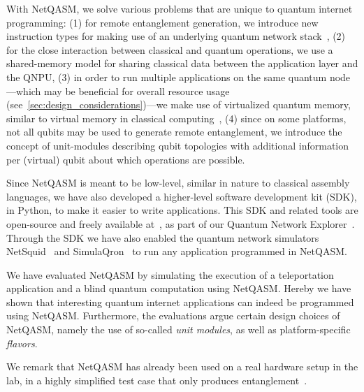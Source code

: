 With \ac{NetQASM}, we solve various problems that are unique to quantum internet programming:
    (1) for remote entanglement generation, we introduce new instruction types for making use of an underlying quantum network stack~\cite{dahlberg2019linklayer, kozlowski2020networklayer},
    (2) for the close interaction between classical and quantum operations, we use a shared-memory model for sharing classical data between the application layer and the \ac{QNPU},
    (3) in order to run multiple applications on the same quantum node---which may be beneficial for overall resource usage (see~\cref{sec:design_considerations})---we make use of virtualized quantum memory, similar to virtual memory in classical computing~\cite{arpaci2018operating},
    (4) since on some platforms, not all qubits may be used to generate remote entanglement, we introduce the concept of unit-modules describing qubit topologies with additional information per (virtual) qubit about which operations are possible.

Since \ac{NetQASM} is meant to be low-level, similar in nature to classical assembly languages, we have also developed a higher-level software development kit (SDK), in Python, to make it easier to write applications.
This SDK and related tools are open-source and freely available at~\cite{git_netqasm}, as part of our Quantum Network Explorer~\cite{qne_website}.
Through the SDK we have also enabled the quantum network simulators NetSquid~\cite{coopmans2021netsquid} and SimulaQron~\cite{dahlberg2018simulaqron} to run any application programmed in \ac{NetQASM}.

We have evaluated \ac{NetQASM} by simulating the execution of a teleportation application and a blind quantum computation using \ac{NetQASM}.
Hereby we have shown that interesting quantum internet applications can indeed be programmed using \ac{NetQASM}.
Furthermore, the evaluations argue certain design choices of \ac{NetQASM}, namely the use of so-called \textit{unit modules}, as well as platform-specific
\textit{flavors}.

We remark that \ac{NetQASM} has already been used on a real hardware setup in the lab, in a highly simplified test case that only produces entanglement~\cite{pompili2021experimental}.

